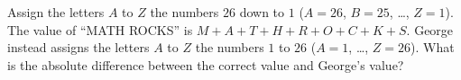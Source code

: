 Assign the letters $A$ to $Z$ the numbers $26$ down to $1$ ($A=26$, $B=25$, \dots, $Z=1$). The value of ``MATH ROCKS'' is $M+A+T+H+R+O+C+K+S$. George instead assigns the letters $A$ to $Z$ the numbers $1$ to $26$ ($A=1$, \dots, $Z=26$). What is the absolute difference between the correct value and George's value?
